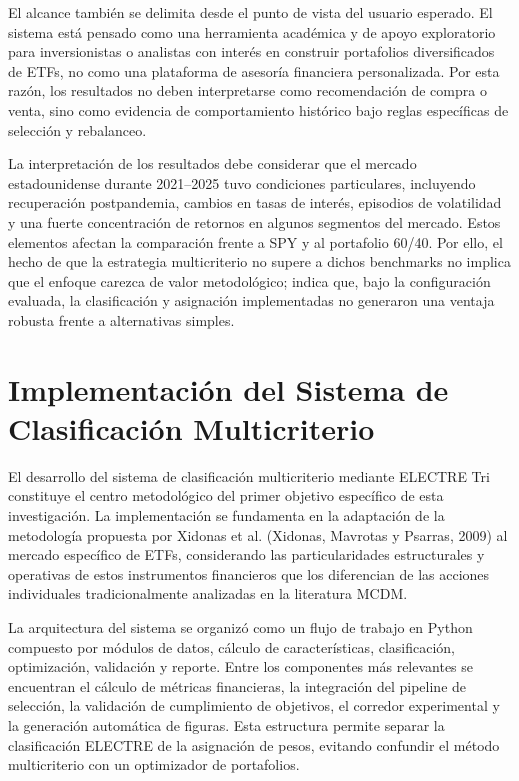 \documentclass[12pt,letterpaper]{article}
\begin{document}
El alcance también se delimita desde el punto de vista del usuario esperado. El sistema está pensado como una herramienta académica y de apoyo exploratorio para inversionistas o analistas con interés en construir portafolios diversificados de ETFs, no como una plataforma de asesoría financiera personalizada. Por esta razón, los resultados no deben interpretarse como recomendación de compra o venta, sino como evidencia de comportamiento histórico bajo reglas específicas de selección y rebalanceo.

La interpretación de los resultados debe considerar que el mercado estadounidense durante 2021--2025 tuvo condiciones particulares, incluyendo recuperación postpandemia, cambios en tasas de interés, episodios de volatilidad y una fuerte concentración de retornos en algunos segmentos del mercado. Estos elementos afectan la comparación frente a SPY y al portafolio 60/40. Por ello, el hecho de que la estrategia multicriterio no supere a dichos benchmarks no implica que el enfoque carezca de valor metodológico; indica que, bajo la configuración evaluada, la clasificación y asignación implementadas no generaron una ventaja robusta frente a alternativas simples.

\section{Implementación del Sistema de Clasificación Multicriterio}

El desarrollo del sistema de clasificación multicriterio mediante ELECTRE Tri constituye el centro metodológico del primer objetivo específico de esta investigación. La implementación se fundamenta en la adaptación de la metodología propuesta por Xidonas et al. (Xidonas, Mavrotas y Psarras, 2009) al mercado específico de ETFs, considerando las particularidades estructurales y operativas de estos instrumentos financieros que los diferencian de las acciones individuales tradicionalmente analizadas en la literatura MCDM.

La arquitectura del sistema se organizó como un flujo de trabajo en Python compuesto por módulos de datos, cálculo de características, clasificación, optimización, validación y reporte. Entre los componentes más relevantes se encuentran el cálculo de métricas financieras, la integración del pipeline de selección, la validación de cumplimiento de objetivos, el corredor experimental y la generación automática de figuras. Esta estructura permite separar la clasificación ELECTRE de la asignación de pesos, evitando confundir el método multicriterio con un optimizador de portafolios.
\end{document}
